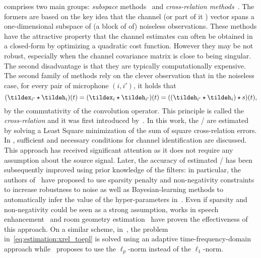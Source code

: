  comprises two main groups: \textit{subspace} methods~ and \textit{cross-relation methods}~.
The formers are based on the key idea that the channel (or part of it ) vector spans a one-dimensional subspace of (a block of of) noiseless observations.
These methods have the attractive property that the channel estimates can often be obtained in a closed-form by optimizing a quadratic cost function.
However they may be not robust, especially when the channel covariance matrix is close to being singular.
The second disadvantage is that they are typically computationally expensive.
\\The second family of methods rely on the clever observation that in the noiseless case, for every pair of microphone $(i, i')$, it holds that
\begin{equation}\label{eq:estimation:xrel_toepl}
    (\tildex_{i'} \convCont \tildeh_i)(t) = (\tildex_{i} \convCont \tildeh_{i'})(t) =  ((\tildeh_{i'} \convCont \tildeh_i) \convCont s)(t)
    ,
\end{equation}
by the commutativity of the convolution operator.
This principle is called the \textit{cross-relation} and it was first introduced by~.
In this work, the \RIR/ are estimated by solving a Least Square minimization of the sum of square cross-relation errors.
In , sufficient and necessary conditions for channel identification are discussed.
This approach has received significant attention as it does not require any assumption about the source signal.
Later, the accuracy of estimated \RIRs/ has been subsequently improved using prior knowledge of the filters:
in particular, the authors of~ have proposed to use sparsity penalty and non-negativity constraints to increase robustness to noise as well as Bayesian-learning methods to automatically infer the value of the hyper-parameters in~.
Even if sparsity and non-negativity could be seen as a strong assumption, works in speech enhancement~ and room geometry estimation~ have proven the effectiveness of this approach.
On a similar scheme, in~, the problem in~\cref{eq:estimation:xrel_toepl} is solved using an adaptive time-frequency-domain approach while~ proposes to use the $\ell_p$-norm instead of the $\ell_1$-norm.

